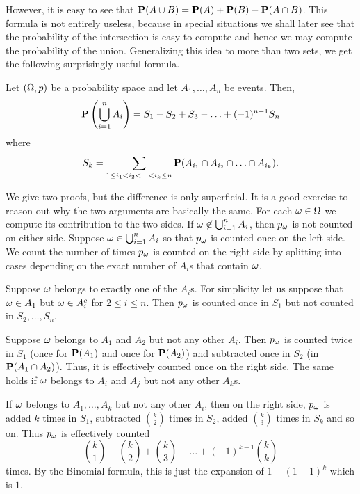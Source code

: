 \documentclass[preprint,  11pt]{amsart}
\begin{document}
However, it is easy to see that $\P(A\cup B)=\P(A)+\P(B)-\P(A\cap B)$. This formula is not entirely useless, because in special situations we shall later see that the probability of the intersection is easy to compute and hence we may compute the probability of the union. Generalizing this idea to more than two sets, we get the following surprisingly useful formula.
 \begin{proposition}
Let $(\Ome,p)$ be a probability space and let $A_{1},\ldots ,A_{n}$ be events. Then,
$$
\P\l(\bigcup_{i=1}^{n}A_{i}\r) = S_{1}-S_{2}+S_{3}-\ldots +(-1)^{n-1}S_{n}
$$
where
$$
S_{k}=\summ_{1\le i_{1}<i_{2}<\ldots <i_{k}\le n}\P(A_{i_{1}}\cap A_{i_{2}}\cap \ldots \cap A_{i_{k}}).
$$
\end{proposition}
We give two proofs, but the difference  is only superficial. It is a good exercise to reason out why the two arguments are basically the same.
 For each $\ome\in \Ome$ we compute its contribution to the two sides. If $\ome\not\in \bigcup_{i=1}^{n}A_{i}$, then $p_{\ome}$ is not counted on either side.  Suppose $\ome\in \bigcup_{i=1}^{n}A_{i}$ so that $p_{\ome}$ is counted once on the left side. We count the number of times $p_{\ome}$ is counted on the right side by splitting into cases depending on the exact number of $A_{i}$s that contain $\ome$.

Suppose $\ome$ belongs to exactly one of the $A_{i}$s. For simplicity let us suppose that $\ome\in A_{1}$ but $\ome\in A_{i}^{c}$ for $2\le i\le n$. Then $p_{\ome}$ is counted once in $S_{1}$ but not counted in $S_{2},\ldots ,S_{n}$.

Suppose $\ome$ belongs to $A_{1}$ and $A_{2}$ but not any other $A_{i}$. Then $p_{\ome}$ is counted twice in $S_{1}$ (once for $\P(A_{1})$ and once for $\P(A_{2})$) and subtracted once in $S_{2}$ (in $\P(A_{1}\cap A_{2})$). Thus, it is effectively counted once on the right side. The same holds if $\ome$ belongs to $A_{i}$ and $A_{j}$ but not any other $A_{k}$s.

If $\ome$ belongs to $A_{1},\ldots ,A_{k}$ but not any other $A_{i}$, then  on the right side, $p_{\ome}$ is added $k$ times in $S_{1}$, subtracted $\binom{k}{2}$ times in $S_{2}$, added $\binom{k}{3}$ times in $S_{k}$ and so on. Thus $p_{\ome}$ is effectively counted
$$
\binom{k}{1}-\binom{k}{2}+\binom{k}{3}-\ldots +(-1)^{k-1}\binom{k}{k}
$$
times. By the Binomial formula, this is just the expansion of  $1-(1-1)^{k}$ which is $1$.
\eprf
\end{document}
